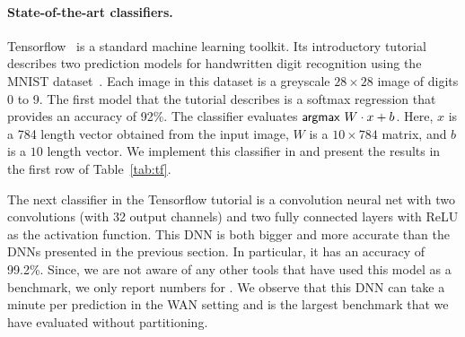 \paragraph{State-of-the-art classifiers.}
Tensorflow~\cite{tensorflow} is a standard machine learning toolkit.
Its introductory tutorial describes two prediction models for handwritten digit recognition
using the MNIST dataset~\cite{mnist}.
Each image in this dataset is a greyscale $28\times 28$ image of
digits 0 to 9.
The first model that the tutorial describes is a softmax regression
that provides an accuracy of 92\%. The classifier evaluates
$ \mathsf{argmax}\ W\cdot x+b$.
Here, $x$ is a 784 length vector obtained from the input image,
 $W$ is a $10\times 784$ matrix, and  $b$ is a $10$ length
vector.
We implement this classifier in \tool and present the results in the
first row of Table~\ref{tab:tf}. 


The next classifier in the Tensorflow tutorial is a convolution neural net with two convolutions
(with 32 output channels) and two fully connected layers with ReLU as the activation function.
This DNN is both bigger and more accurate than the DNNs presented in the previous section.
In particular, it has an accuracy of 99.2\%.
Since, we are not aware of any other tools that have used this
model as a benchmark, we only report numbers for \tool.
We observe that this DNN can take a minute per prediction in the WAN
setting and is the largest benchmark that we have evaluated without
partitioning.


